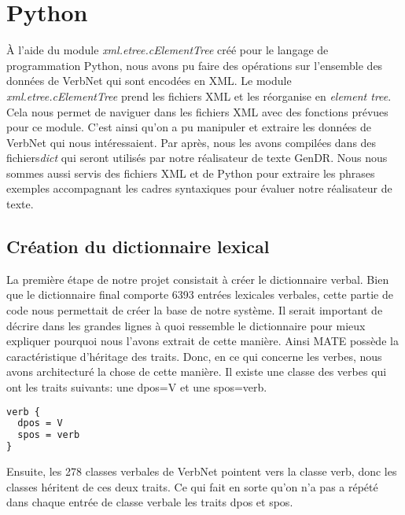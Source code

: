 \chapter{Python}\label{python}


À l'aide du module \emph{xml.etree.cElementTree} créé pour le langage de programmation Python, nous avons pu faire des opérations sur l'ensemble des données de VerbNet qui sont encodées en XML. Le module \emph{xml.etree.cElementTree} prend les fichiers XML et les réorganise en \emph{element tree}. Cela nous permet de naviguer dans les fichiers XML avec des fonctions prévues pour ce module. C'est ainsi qu'on a pu manipuler et extraire les données de VerbNet qui nous intéressaient. Par après, nous les avons compilées dans des fichiers\emph{dict} qui seront utilisés par notre réalisateur de texte GenDR. Nous nous sommes aussi servis des fichiers XML et de Python pour extraire les phrases exemples accompagnant les cadres syntaxiques pour évaluer notre réalisateur de texte.

\section{Création du dictionnaire lexical}

La première étape de notre projet consistait à créer le dictionnaire verbal. Bien que le dictionnaire final comporte 6393 entrées lexicales verbales, cette partie de code nous permettait de créer la base de notre système. Il serait important de décrire dans les grandes lignes à quoi ressemble le dictionnaire pour mieux expliquer pourquoi nous l'avons extrait de cette manière. Ainsi MATE possède la caractéristique d'héritage des traits. Donc, en ce qui concerne les verbes, nous avons architecturé la chose de cette manière. Il existe une classe des verbes qui ont les traits suivants: une dpos=V et une spos=verb.

\begin{lstlisting}[language=XML]
verb {
  dpos = V
  spos = verb
}
\end{lstlisting}

Ensuite, les 278 classes verbales de VerbNet pointent vers la classe verb, donc les classes héritent de ces deux traits. Ce qui fait en sorte qu'on n'a pas a répété dans chaque entrée de classe verbale les traits dpos et spos. 

